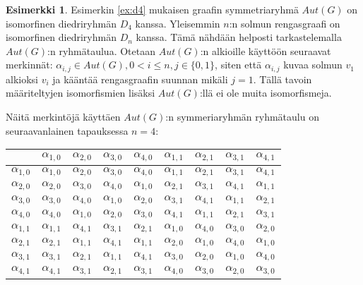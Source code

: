 \documentclass[a4paper, 12pt]{article}
\theoremstyle{definition}
\newtheorem{example}[mydef]{Esimerkki}
\theoremstyle{plain}
\begin{document}
\begin{example}
Esimerkin \ref{ex:d4} mukaisen graafin symmetriaryhmä $Aut(G)$ on isomorfinen diedriryhmän $D_4$ kanssa. Yleisemmin $n$:n solmun rengasgraafi on isomorfinen diedriryhmän $D_n$ kanssa. Tämä nähdään helposti tarkastelemalla $Aut(G)$:n ryhmätaulua. Otetaan $Aut(G)$:n alkioille käyttöön seuraavat merkinnät: $\alpha_{i, j} \in Aut(G), 0 < i \leq n, j \in \{0, 1\}$, siten että $\alpha_{i, j}$ kuvaa solmun $v_1$ alkioksi $v_i$ ja kääntää rengasgraafin suunnan mikäli $j = 1$. Tällä tavoin määriteltyjen isomorfismien lisäksi $Aut(G)$:llä ei ole muita isomorfismeja.

Näitä merkintöjä käyttäen $Aut(G)$:n symmeriaryhmän ryhmätaulu on seuraavanlainen tapauksessa $n=4$:

\begin{center}
\begin{tabular} {l | l l l l l l l l}
	                & $\alpha_{1, 0}$ & $\alpha_{2, 0}$ & $\alpha_{3, 0}$ & $\alpha_{4, 0}$ & $\alpha_{1, 1}$ & $\alpha_{2, 1}$ & $\alpha_{3, 1}$ & $\alpha_{4, 1}$ \\
\hline
$\alpha_{1, 0}$ & $\alpha_{1, 0}$ & $\alpha_{2, 0}$ & $\alpha_{3, 0}$ & $\alpha_{4, 0}$ & $\alpha_{1, 1}$ & $\alpha_{2, 1}$ & $\alpha_{3, 1}$ & $\alpha_{4, 1}$ \\
$\alpha_{2, 0}$ & $\alpha_{2, 0}$ & $\alpha_{3, 0}$ & $\alpha_{4, 0}$ & $\alpha_{1, 0}$ & $\alpha_{2, 1}$ & $\alpha_{3, 1}$ & $\alpha_{4, 1}$ & $\alpha_{1, 1}$ \\
$\alpha_{3, 0}$ & $\alpha_{3, 0}$ & $\alpha_{4, 0}$ & $\alpha_{1, 0}$ & $\alpha_{2, 0}$ & $\alpha_{3, 1}$ & $\alpha_{4, 1}$ & $\alpha_{1, 1}$ & $\alpha_{2, 1}$ \\
$\alpha_{4, 0}$ & $\alpha_{4, 0}$ & $\alpha_{1, 0}$ & $\alpha_{2, 0}$ & $\alpha_{3, 0}$ & $\alpha_{4, 1}$ & $\alpha_{1, 1}$ & $\alpha_{2, 1}$ & $\alpha_{3, 1}$ \\
$\alpha_{1, 1}$ & $\alpha_{1, 1}$ & $\alpha_{4, 1}$ & $\alpha_{3, 1}$ & $\alpha_{2, 1}$ & $\alpha_{1, 0}$ & $\alpha_{4, 0}$ & $\alpha_{3, 0}$ & $\alpha_{2, 0}$ \\
$\alpha_{2, 1}$ & $\alpha_{2, 1}$ & $\alpha_{1, 1}$ & $\alpha_{4, 1}$ & $\alpha_{1, 1}$ & $\alpha_{2, 0}$ & $\alpha_{1, 0}$ & $\alpha_{4, 0}$ & $\alpha_{1, 0}$ \\
$\alpha_{3, 1}$ & $\alpha_{3, 1}$ & $\alpha_{2, 1}$ & $\alpha_{1, 1}$ & $\alpha_{4, 1}$ & $\alpha_{3, 0}$ & $\alpha_{2, 0}$ & $\alpha_{1, 0}$ & $\alpha_{4, 0}$ \\
$\alpha_{4, 1}$ & $\alpha_{4, 1}$ & $\alpha_{3, 1}$ & $\alpha_{2, 1}$ & $\alpha_{3, 1}$ & $\alpha_{4, 0}$ & $\alpha_{3, 0}$ & $\alpha_{2, 0}$ & $\alpha_{3, 0}$ \\
\end{tabular}
\end{center}


\end{example}
\end{document}
